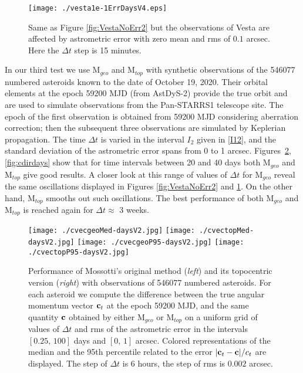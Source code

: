 \documentclass[11pt]{article}
\begin{document}
\begin{figure}[ht!]
    \centering
    \texttt{[image: ./vesta1e-1ErrDaysV4.eps]}
    \caption{Same as Figure \ref{fig:VestaNoErr2} but the observations of Vesta are affected by astrometric error with zero mean and rms of $0.1$ arcsec. 
    Here the $\Delta t$ step is 15 minutes.}
    \label{fig:Vesta1e-1Err2}
\end{figure}

In our third test we use M$_{geo}$ and M$_{top}$ with synthetic observations of the 546077 numbered asteroids known to the date of October 19, 2020. 
Their orbital elements at the epoch 59200 MJD (from AstDyS-2) provide the true orbit and are used to simulate observations from the Pan-STARRS1 telescope site.
The epoch of the first observation is obtained from 59200 MJD considering aberration correction; then the subsequent three observations are simulated by Keplerian propagation. 
The time $\Delta t$ is varied in the interval $I_2$ given in \eqref{I12}, and the standard deviation of the astrometric error spans from 0 to 1 arcsec.
Figures~\ref{fig:cvecdays}, \ref{fig:cdirdays} show that for time intervals between 20 and 40 days both M$_{geo}$ and M$_{top}$ give good results. 
A closer look at this range of values of $\Delta t$ for M$_{geo}$ reveal the same oscillations displayed in Figures \ref{fig:VestaNoErr2} and \ref{fig:Vesta1e-1Err2}. 
On the other hand, M$_{top}$ smooths out such oscillations. 
The best performance of both M$_{geo}$ and M$_{top}$ is reached again for $\Delta t\approx$ 3 weeks.

\begin{figure}[ht]
    \centering
    \texttt{[image: ./cvecgeoMed-daysV2.jpg]}
    \texttt{[image: ./cvectopMed-daysV2.jpg]}
    \texttt{[image: ./cvecgeoP95-daysV2.jpg]}
    \texttt{[image: ./cvectopP95-daysV2.jpg]}
    \vspace{-3mm}
    \caption{Performance of Mossotti's original method (\emph{left}) and its topocentric version (\emph{right}) with observations of 546077 numbered asteroids. 
    For each asteroid we compute the difference between the true angular momentum vector ${\bf c}_t$ at the epoch 59200 MJD, and the same quantity ${\bf c}$ obtained by either M$_{geo}$ or M$_{top}$ on a uniform grid of values of $\Delta t$ and rms of the astrometric error in the intervals $[0.25,\,100]$ days and $[0,\,1]$ arcsec. 
    Colored representations of the median and the 95th percentile related to the error $|{\bf c}_t-{\bf c}|/c_t$ are displayed.
    The step of $\Delta t$ is 6 hours, the step of rms is $0.002$ arcsec.}
    \label{fig:cvecdays}
\end{figure}
\end{document}
